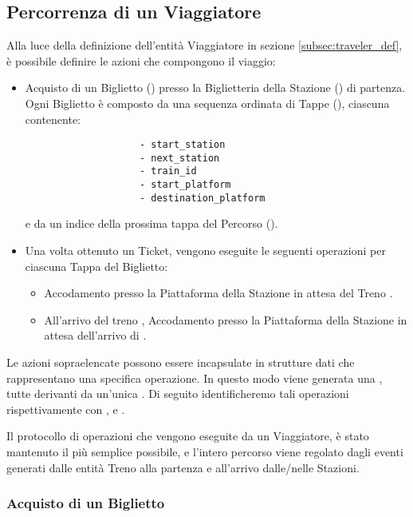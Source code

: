 \subsection{Percorrenza di un Viaggiatore}
	
	Alla luce della definizione dell'entità Viaggiatore in sezione \ref{subsec:traveler_def}, è possibile definire le azioni che compongono il viaggio:
		\begin{itemize}
			\item Acquisto di un Biglietto () presso la Biglietteria della Stazione () di partenza. Ogni Biglietto è composto da una sequenza ordinata di Tappe (), ciascuna contenente:
				\begin{verbatim}
					- start_station
					- next_station
					- train_id 
					- start_platform 
					- destination_platform
				\end{verbatim}
			e da un indice della prossima tappa del Percorso ().
			
			\item Una volta ottenuto un Ticket, vengono eseguite le seguenti operazioni per ciascuna Tappa del Biglietto:
				\begin{itemize}
					\item Accodamento presso la Piattaforma  della Stazione  in attesa del Treno .
					\item All'arrivo del treno , Accodamento presso la Piattaforma  della Stazione  in attesa dell'arrivo di . 
				\end{itemize}
		\end{itemize} 
	Le azioni sopraelencate possono essere incapsulate in strutture dati che rappresentano una specifica operazione. In questo modo viene generata una , tutte derivanti da un'unica . Di seguito identificheremo tali operazioni rispettivamente con ,  e .
	
	Il protocollo di operazioni che vengono eseguite da un Viaggiatore, è stato mantenuto il più semplice possibile, e l'intero percorso viene regolato dagli eventi generati dalle entità Treno alla partenza e all'arrivo dalle/nelle Stazioni. 
	
	\subsubsection{Acquisto di un Biglietto}
	
